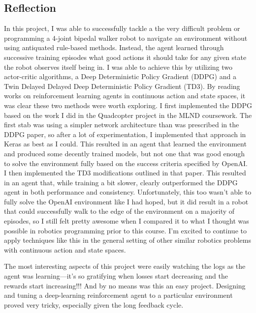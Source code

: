 \documentclass{article}
\begin{document}
\subsection{Reflection}
In this project, I was able to successfully tackle a the very difficult problem or programming a 4-joint bipedal walker robot to navigate an environment without using antiquated rule-based methods. Instead, the agent learned through successive training episodes what good actions it should take for any given state the robot observes itself being in. I was able to achieve this by utilizing two actor-critic algorithms, a Deep Deterministic Policy Gradient (DDPG) and a Twin Delayed Delayed Deep Deterministic Policy Gradient (TD3). By reading works on reinforcement learning agents in continuous action and state spaces, it was clear these two methods were worth exploring. I first implemented the DDPG based on the work I did in the Quadcopter project in the MLND coursework. The first stab was using a simpler network architecture than was prescribed in the DDPG paper, so after a lot of experimentation, I implemented that approach in Keras as best as I could. This resulted in an agent that learned the environment and produced some decently trained models, but not one that was good enough to solve the environment fully based on the success criteria specified by OpenAI. I then implemented the TD3 modifications outlined in that paper. This resulted in an agent that, while training a bit slower, clearly outperformed the DDPG agent in both performance and consistency. Unfortunately, this too wasn't able to fully solve the OpenAI environment like I had hoped, but it did result in a robot that could successfully walk to the edge of the environment on a majority of episodes, so I still felt pretty awesome when I compared it to what I thought was possible in robotics programming prior to this course. I'm excited to continue to apply techniques like this in the general setting of other similar robotics problems with continuous action and state spaces.

The most interesting aspects of this project were easily watching the logs as the agent was learning—it's so gratifying when losses start decreasing and the rewards start increasing!!! And by no means was this an easy project. Designing and tuning a deep-learning reinforcement agent to a particular environment proved very tricky, especially given the long feedback cycle. 
\end{document}
